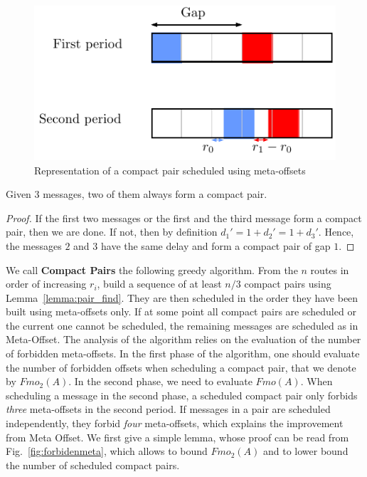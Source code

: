 \documentclass[a4paper,UKenglish,cleveref, autoref, thm-restate]{lipics-v2019}
\begin{document}
\begin{figure}[h]
\begin{center}

\includegraphics[scale=0.7]{compact_pair}
\end{center}
\caption{Representation of a compact pair scheduled using meta-offsets}
\label{fig:compactpair}
\end{figure}

\begin{lemma}\label{lemma:pair_find}
Given $3$ messages, two of them always form a compact pair. 
\end{lemma}
\begin{proof}
If the first two messages or the first and the third message form a compact pair,
then we are done. If not, then by definition $d_{1}' = 1 + d_{2}' = 1 + d_{3}'$. Hence, the messages $2$ and $3$ have the same delay and form a compact pair of gap $1$.
\end{proof}

We call \textbf{Compact Pairs} the following greedy algorithm. From the $n$ routes in order
of increasing $r_i$, build a sequence of at least $n/3$ compact pairs using Lemma~\ref{lemma:pair_find}. They are then scheduled in the order they have been built using meta-offsets only. If at some point all compact pairs are scheduled or the current one cannot be scheduled, the remaining messages are scheduled as in Meta-Offset. The analysis of the algorithm relies on the evaluation of the number of forbidden meta-offsets. In the first phase of the algorithm, one should evaluate the number of forbidden offsets when scheduling a compact pair, that we denote by $Fmo_2(A)$. In the second phase, we need to evaluate $Fmo(A)$. When scheduling a message in the second phase, a scheduled compact pair only forbids \emph{three} meta-offsets in the second period. If messages in a pair are scheduled independently, they forbid \emph{four} meta-offsets, which explains the improvement from Meta Offset. We first give a simple lemma, whose proof can be read from Fig.~\ref{fig:forbidenmeta}, which allows to bound $Fmo_2(A)$ and to lower bound the number of scheduled compact pairs.
\end{document}
